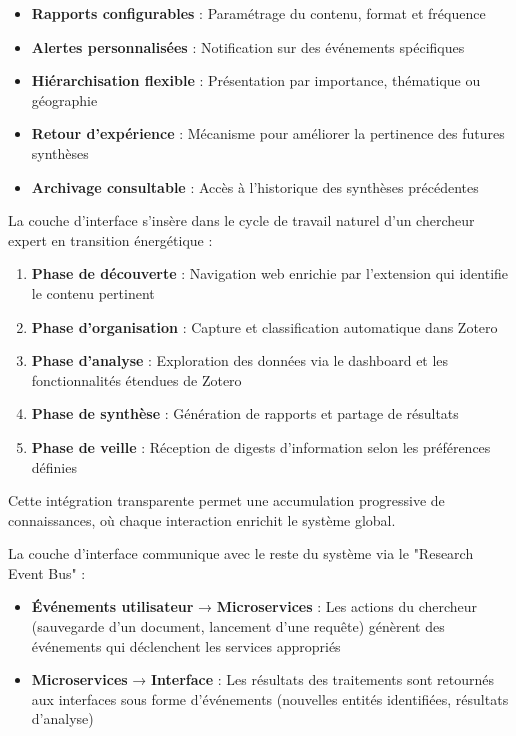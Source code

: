 \documentclass[a4paper,11pt]{report}
\providecommand{\tightlist}{\setlength{\itemsep}{0pt}\setlength{\parskip}{0pt}}
\begin{document}
\begin{itemize}
\tightlist
\item
  \textbf{Rapports configurables} : Paramétrage du contenu, format et fréquence
\item
  \textbf{Alertes personnalisées} : Notification sur des événements spécifiques
\item
  \textbf{Hiérarchisation flexible} : Présentation par importance, thématique ou géographie
\item
  \textbf{Retour d'expérience} : Mécanisme pour améliorer la pertinence des futures synthèses
\item
  \textbf{Archivage consultable} : Accès à l'historique des synthèses précédentes
\end{itemize}

La couche d'interface s'insère dans le cycle de travail naturel d'un chercheur expert en transition énergétique :

\begin{enumerate}
\def\labelenumi{\arabic{enumi}.}
\tightlist
\item
  \textbf{Phase de découverte} : Navigation web enrichie par l'extension qui identifie le contenu pertinent
\item
  \textbf{Phase d'organisation} : Capture et classification automatique dans Zotero
\item
  \textbf{Phase d'analyse} : Exploration des données via le dashboard et les fonctionnalités étendues de Zotero
\item
  \textbf{Phase de synthèse} : Génération de rapports et partage de résultats
\item
  \textbf{Phase de veille} : Réception de digests d'information selon les préférences définies
\end{enumerate}

Cette intégration transparente permet une accumulation progressive de connaissances, où chaque interaction enrichit le système global.

La couche d'interface communique avec le reste du système via le "Research Event Bus" :

\begin{itemize}
\tightlist
\item
  \textbf{Événements utilisateur} → \textbf{Microservices} : Les actions du chercheur (sauvegarde d'un document, lancement d'une requête) génèrent des événements qui déclenchent les services appropriés
\item
  \textbf{Microservices} → \textbf{Interface} : Les résultats des traitements sont retournés aux interfaces sous forme d'événements (nouvelles entités identifiées, résultats d'analyse)
\end{itemize}
\end{document}
